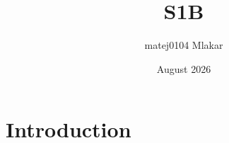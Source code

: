 \documentclass{article}
\title{S1B}
\author{matej0104 Mlakar}
\date{August 2026}
\begin{document}
\maketitle

\section{Introduction}
\end{document}
